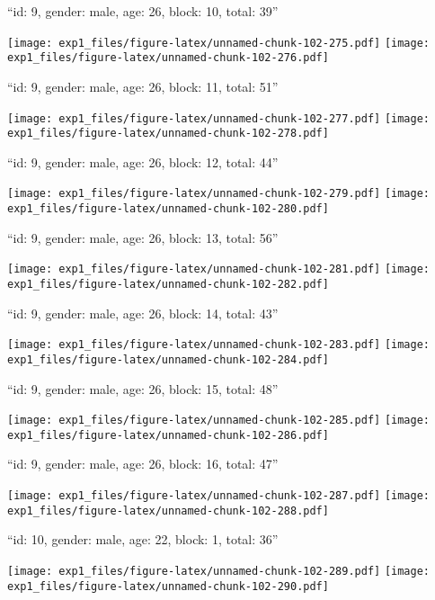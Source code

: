 \documentclass[11pt,,]{article}
\begin{document}
\newpage
[1] 

``id: 9, gender: male, age: 26, block: 10, total: 39''

\texttt{[image: exp1\_files/figure-latex/unnamed-chunk-102-275.pdf]}
\texttt{[image: exp1\_files/figure-latex/unnamed-chunk-102-276.pdf]}

\newpage
[1] 

``id: 9, gender: male, age: 26, block: 11, total: 51''

\texttt{[image: exp1\_files/figure-latex/unnamed-chunk-102-277.pdf]}
\texttt{[image: exp1\_files/figure-latex/unnamed-chunk-102-278.pdf]}

\newpage
[1] 

``id: 9, gender: male, age: 26, block: 12, total: 44''

\texttt{[image: exp1\_files/figure-latex/unnamed-chunk-102-279.pdf]}
\texttt{[image: exp1\_files/figure-latex/unnamed-chunk-102-280.pdf]}

\newpage
[1] 

``id: 9, gender: male, age: 26, block: 13, total: 56''

\texttt{[image: exp1\_files/figure-latex/unnamed-chunk-102-281.pdf]}
\texttt{[image: exp1\_files/figure-latex/unnamed-chunk-102-282.pdf]}

\newpage
[1] 

``id: 9, gender: male, age: 26, block: 14, total: 43''

\texttt{[image: exp1\_files/figure-latex/unnamed-chunk-102-283.pdf]}
\texttt{[image: exp1\_files/figure-latex/unnamed-chunk-102-284.pdf]}

\newpage
[1] 

``id: 9, gender: male, age: 26, block: 15, total: 48''

\texttt{[image: exp1\_files/figure-latex/unnamed-chunk-102-285.pdf]}
\texttt{[image: exp1\_files/figure-latex/unnamed-chunk-102-286.pdf]}

\newpage
[1] 

``id: 9, gender: male, age: 26, block: 16, total: 47''

\texttt{[image: exp1\_files/figure-latex/unnamed-chunk-102-287.pdf]}
\texttt{[image: exp1\_files/figure-latex/unnamed-chunk-102-288.pdf]}

\newpage
[1] 

``id: 10, gender: male, age: 22, block: 1, total: 36''

\texttt{[image: exp1\_files/figure-latex/unnamed-chunk-102-289.pdf]}
\texttt{[image: exp1\_files/figure-latex/unnamed-chunk-102-290.pdf]}
\end{document}
